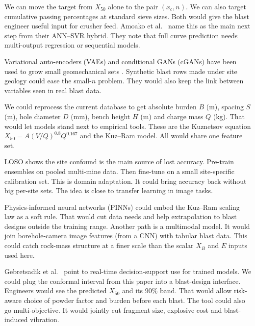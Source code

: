 \documentclass[conference]{IEEEtran}
\begin{document}
We can move the target from $X_{50}$ alone to the pair $(x_c, n)$. We can also target cumulative passing percentages at standard sieve sizes. Both would give the blast engineer useful input for crusher feed. Amoako et al.\ \cite{amoako2022} name this as the main next step from their ANN--SVR hybrid. They note that full curve prediction needs multi-output regression or sequential models.

Variational auto-encoders (VAEs) and conditional GANs (cGANs) have been used to grow small geomechanical sets \cite{amoako2022}. Synthetic blast rows made under site geology could ease the small-$n$ problem. They would also keep the link between variables seen in real blast data.

We could reprocess the current database to get absolute burden $B$ (m), spacing $S$ (m), hole diameter $D$ (mm), bench height $H$ (m) and charge mass $Q$ (kg). That would let models stand next to empirical tools. These are the Kuznetsov equation $X_{50}=A(V/Q)^{0.8}Q^{0.167}$ \cite{kuznetsov1973} and the Kuz--Ram model. All would share one feature set.

LOSO shows the site confound is the main source of lost accuracy. Pre-train ensembles on pooled multi-mine data. Then fine-tune on a small site-specific calibration set. This is domain adaptation. It could bring accuracy back without big per-site sets. The idea is close to transfer learning in image tasks.

Physics-informed neural networks (PINNs) could embed the Kuz--Ram scaling law as a soft rule. That would cut data needs and help extrapolation to blast designs outside the training range. Another path is a multimodal model. It would join borehole-camera image features (from a CNN) with tabular blast data. This could catch rock-mass structure at a finer scale than the scalar $X_B$ and $E$ inputs used here.

Gebretsadik et al.\ \cite{gebretsadik2024} point to real-time decision-support use for trained models. We could plug the conformal interval from this paper into a blast-design interface. Engineers would see the predicted $X_{50}$ and its 90\% band. That would allow risk-aware choice of powder factor and burden before each blast. The tool could also go multi-objective. It would jointly cut fragment size, explosive cost and blast-induced vibration.



\end{document}
